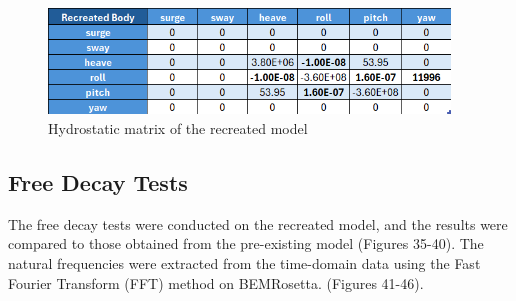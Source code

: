 \documentclass[a4paper, 11pt]{article}
\begin{document}
\begin{figure}[H]
    \centering
    \includegraphics[width=0.95\textwidth]{hyd_st_re.png}
    \caption{\small Hydrostatic matrix of the recreated model}
    \label{fig:hyd_st_re}
\end{figure}

\subsection{Free Decay Tests}
\hspace*{0.5cm}The free decay tests were conducted on the recreated model, and the results were compared to those obtained from the pre-existing model (Figures 35-40). The natural frequencies were extracted from the time-domain data using the Fast Fourier Transform (FFT) method on BEMRosetta. (Figures 41-46). 
\end{document}
